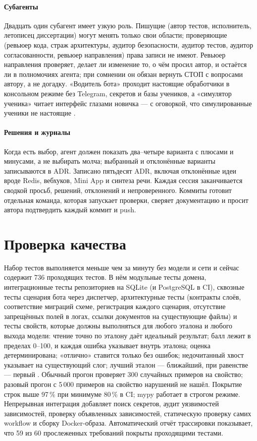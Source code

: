\paragraph{Субагенты} Двадцать один субагент имеет узкую роль. Пишущие (автор тестов, исполнитель,
летописец диссертации) могут менять только свои области; проверяющие (ревьюер кода, страж архитектуры,
аудитор безопасности, аудитор тестов, аудитор согласованности, ревьюер направления) права записи не имеют.
Ревьюер направления проверяет, делает ли изменение то, о чём просил автор, и остаётся ли в полномочиях
агента; при сомнении он обязан вернуть СТОП с вопросами автору, а не догадку. «Водитель бота» проходит
настоящие обработчики в консольном режиме без Telegram, секретов и базы учеников, а «симулятор ученика»
читает интерфейс глазами новичка --- с оговоркой, что симулированные ученики не настоящие \cite{SRC-083}.

\paragraph{Решения и журналы} Когда есть выбор, агент должен показать два--четыре варианта с плюсами и
минусами, а не выбирать молча; выбранный и отклонённые варианты записываются в ADR. Записано пятьдесят
ADR, включая отклонённые идеи вроде Redis, вебхуков, Mini App и синтеза речи. Каждая сессия заканчивается
сводкой просьб, решений, отклонений и непроверенного. Коммиты готовит отдельная команда, которая
запускает проверки, сверяет документацию и просит автора подтвердить каждый коммит и push.

\section{Проверка качества}\label{sec:impl-verification}

Набор тестов выполняется меньше чем за минуту без модели и сети и сейчас содержит 736 проходящих тестов.
В нём модульные тесты домена, интеграционные тесты репозиториев на SQLite (и PostgreSQL в CI), сквозные
тесты сценария бота через диспетчер, архитектурные тесты (контракты слоёв, соответствие миграций схеме,
регистрация каждого сценария, отсутствие запрещённых полей в логах, ссылки документов на существующие
файлы) и тесты свойств, которые должны выполняться для любого эталона и любого выхода модели: чтение
точно по эталону даёт идеальный результат; балл лежит в пределах 0--100, и каждая ошибка указывает внутрь
эталона; оценка детерминирована; «отлично» ставится только без ошибок; недочитанный хвост указывает на
существующий слог; лучший эталон --- ближайший, при равенстве --- первый \cite{SRC-096}. Обычный прогон
проверяет 300 случайных примеров на свойство; разовый прогон с 5\,000 примеров на свойство нарушений не
нашёл. Покрытие строк выше 97\,\% при минимуме 80\,\% в CI; mypy работает в строгом режиме. Непрерывная
интеграция добавляет поиск секретов, аудит уязвимостей зависимостей, проверку объявленных зависимостей,
статическую проверку самих workflow и сборку Docker-образа. Автоматический отчёт трассировки показывает,
что 59 из 60 прослеженных требований покрыты проходящими тестами.
